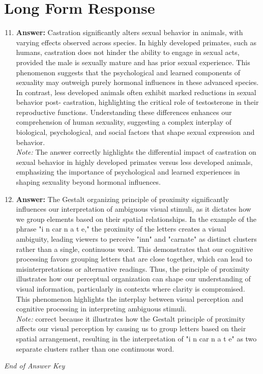 \documentclass[12pt]{article}
\begin{document}
\section*{Long Form Response}
\begin{enumerate}[label=\arabic*.]
\setcounter{enumi}{10}
\item \textbf{Answer:} Castration significantly alters sexual behavior in animals, with varying effects observed across species. In highly developed primates, such as humans, castration does not hinder the ability to engage in sexual acts, provided the male is sexually mature and has prior sexual experience. This phenomenon suggests that the psychological and learned components of sexuality may outweigh purely hormonal influences in these advanced species. In contrast, less developed animals often exhibit marked reductions in sexual behavior post- castration, highlighting the critical role of testosterone in their reproductive functions. Understanding these differences enhances our comprehension of human sexuality, suggesting a complex interplay of biological, psychological, and social factors that shape sexual expression and behavior.
\\ \textit{Note:} The answer correctly highlights the differential impact of castration on sexual behavior in highly developed primates versus less developed animals, emphasizing the importance of psychological and learned experiences in shaping sexuality beyond hormonal influences.
\item \textbf{Answer:} The Gestalt organizing principle of proximity significantly influences our interpretation of ambiguous visual stimuli, as it dictates how we group elements based on their spatial relationships. In the example of the phrase "i n car n a t e," the proximity of the letters creates a visual ambiguity, leading viewers to perceive "inn" and "carnate" as distinct clusters rather than a single, continuous word. This demonstrates that our cognitive processing favors grouping letters that are close together, which can lead to misinterpretations or alternative readings. Thus, the principle of proximity illustrates how our perceptual organization can shape our understanding of visual information, particularly in contexts where clarity is compromised. This phenomenon highlights the interplay between visual perception and cognitive processing in interpreting ambiguous stimuli.
\\ \textit{Note:} correct because it illustrates how the Gestalt principle of proximity affects our visual perception by causing us to group letters based on their spatial arrangement, resulting in the interpretation of "i n car n a t e" as two separate clusters rather than one continuous word.
\end{enumerate}

\vfill
\noindent\textit{End of Answer Key}
\end{document}
